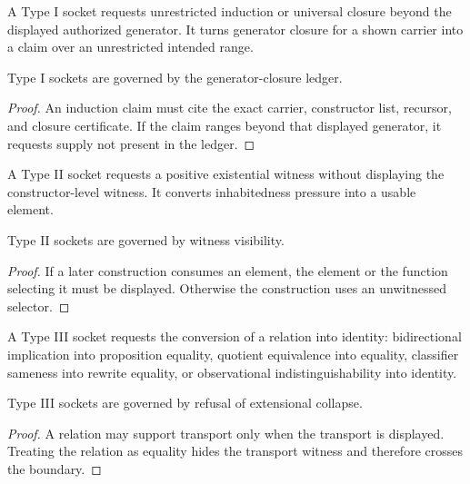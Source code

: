 \begin{definition}
\label{def:philosophy-type-i-socket}
A Type I socket requests unrestricted induction or universal closure
beyond the displayed authorized generator. It turns generator closure
for a shown carrier into a claim over an unrestricted intended range.
\end{definition}

\begin{theorem}
\label{thm:philosophy-type-i-gate}
Type I sockets are governed by the generator-closure ledger.
\end{theorem}
\begin{proof}
An induction claim must cite the exact carrier, constructor list,
recursor, and closure certificate. If the claim ranges beyond that
displayed generator, it requests supply not present in the ledger.
\end{proof}

\begin{definition}
\label{def:philosophy-type-ii-socket}
A Type II socket requests a positive existential witness without
displaying the constructor-level witness. It converts inhabitedness
pressure into a usable element.
\end{definition}

\begin{theorem}
\label{thm:philosophy-type-ii-gate}
Type II sockets are governed by witness visibility.
\end{theorem}
\begin{proof}
If a later construction consumes an element, the element or the
function selecting it must be displayed. Otherwise the construction
uses an unwitnessed selector.
\end{proof}

\begin{definition}
\label{def:philosophy-type-iii-socket}
A Type III socket requests the conversion of a relation into identity:
bidirectional implication into proposition equality, quotient
equivalence into equality, classifier sameness into rewrite equality,
or observational indistinguishability into identity.
\end{definition}

\begin{theorem}
\label{thm:philosophy-type-iii-gate}
Type III sockets are governed by refusal of extensional collapse.
\end{theorem}
\begin{proof}
A relation may support transport only when the transport is displayed.
Treating the relation as equality hides the transport witness and
therefore crosses the boundary.
\end{proof}

